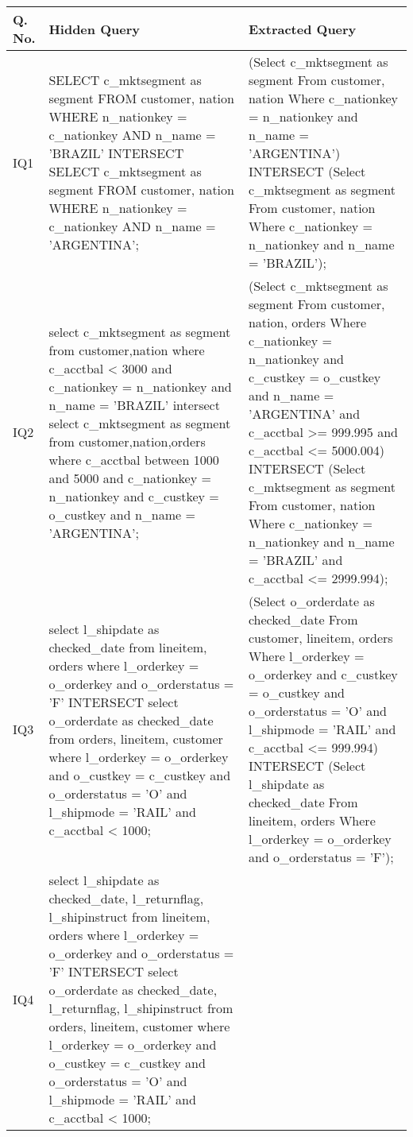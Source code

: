 {\tiny
\begin{longtable}{|p{0.5cm}|p{7cm}|p{7cm}|}
\hline
{\bf Q. No.} & {\bf Hidden Query} & {\bf Extracted Query} \\\hline\hline
IQ1&
SELECT c\_mktsegment as segment FROM customer, nation WHERE n\_nationkey = c\_nationkey AND n\_name = 'BRAZIL' INTERSECT SELECT c\_mktsegment as segment FROM customer, nation WHERE n\_nationkey = c\_nationkey AND n\_name = 'ARGENTINA';&
(Select c\_mktsegment as segment From customer, nation Where c\_nationkey = n\_nationkey and n\_name  = 'ARGENTINA')  INTERSECT  (Select c\_mktsegment as segment From customer, nation Where c\_nationkey = n\_nationkey and n\_name  = 'BRAZIL');\\\hline
IQ2&
select c\_mktsegment as segment from customer,nation where c\_acctbal < 3000 and c\_nationkey = n\_nationkey and n\_name = 'BRAZIL' intersect select c\_mktsegment as segment from customer,nation,orders where c\_acctbal between 1000 and 5000 and c\_nationkey = n\_nationkey and c\_custkey = o\_custkey and n\_name = 'ARGENTINA';&
(Select c\_mktsegment as segment From customer, nation, orders Where c\_nationkey = n\_nationkey and c\_custkey = o\_custkey and n\_name  = 'ARGENTINA' and c\_acctbal  >= 999.995 and c\_acctbal <= 5000.004)  INTERSECT  (Select c\_mktsegment as segment From customer, nation Where c\_nationkey = n\_nationkey and n\_name  = 'BRAZIL' and c\_acctbal  <= 2999.994);\\\hline
IQ3&
select l\_shipdate as checked\_date from lineitem, orders where l\_orderkey = o\_orderkey  and o\_orderstatus = 'F' INTERSECT select o\_orderdate as checked\_date from orders, lineitem, customer where l\_orderkey = o\_orderkey and o\_custkey = c\_custkey and o\_orderstatus = 'O' and l\_shipmode = 'RAIL' and c\_acctbal < 1000;&
(Select o\_orderdate as checked\_date From customer, lineitem, orders Where l\_orderkey = o\_orderkey and c\_custkey = o\_custkey and o\_orderstatus  = 'O' and l\_shipmode  = 'RAIL' and c\_acctbal  <= 999.994)  INTERSECT  (Select l\_shipdate as checked\_date From lineitem, orders Where l\_orderkey = o\_orderkey and o\_orderstatus  = 'F');\\\hline
IQ4&
select l\_shipdate as checked\_date, l\_returnflag, l\_shipinstruct from lineitem, orders where l\_orderkey = o\_orderkey  and o\_orderstatus = 'F' INTERSECT select o\_orderdate as checked\_date, l\_returnflag, l\_shipinstruct from orders, lineitem, customer where l\_orderkey = o\_orderkey and o\_custkey = c\_custkey and o\_orderstatus = 'O' and l\_shipmode = 'RAIL' and c\_acctbal < 1000;&

\end{longtable}}
